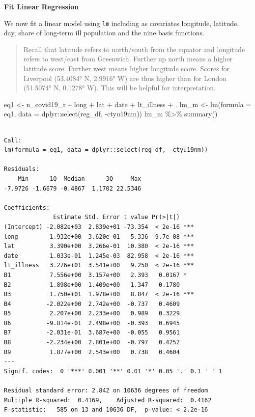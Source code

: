 \documentclass[
  letterpaper,
  DIV=11,
  numbers=noendperiod,
  oneside]{scrreprt}
\newenvironment{Shaded}{\begin{snugshade}}{\end{snugshade}}
\newcommand{\AttributeTok}[1]{\textcolor[rgb]{0.40,0.45,0.13}{#1}}
\newcommand{\FunctionTok}[1]{\textcolor[rgb]{0.28,0.35,0.67}{#1}}
\newcommand{\NormalTok}[1]{\textcolor[rgb]{0.00,0.23,0.31}{#1}}
\newcommand{\OtherTok}[1]{\textcolor[rgb]{0.00,0.23,0.31}{#1}}
\newcommand{\SpecialCharTok}[1]{\textcolor[rgb]{0.37,0.37,0.37}{#1}}
\begin{document}
\textbf{Fit Linear Regression}

We now fit a linear model using \texttt{lm} including as covariates
longitude, latitude, day, share of long-term ill population and the nine
basis functions.

\begin{quote}
Recall that latitude refers to north/south from the equator and
longitude refers to west/east from Greenwich. Further up north means a
higher latitude score. Further west means higher longitude score. Scores
for Liverpool (53.4084° N, 2.9916° W) are thus higher than for London
(51.5074° N, 0.1278° W). This will be helpful for interpretation.
\end{quote}

\begin{Shaded}
\begin{Highlighting}[]
\NormalTok{eq1 }\OtherTok{\textless{}{-}}\NormalTok{ n\_covid19\_r }\SpecialCharTok{\textasciitilde{}}\NormalTok{ long }\SpecialCharTok{+}\NormalTok{ lat }\SpecialCharTok{+}\NormalTok{ date }\SpecialCharTok{+}\NormalTok{ lt\_illness }\SpecialCharTok{+}\NormalTok{ .}
\NormalTok{lm\_m }\OtherTok{\textless{}{-}} \FunctionTok{lm}\NormalTok{(}\AttributeTok{formula =}\NormalTok{ eq1, }
           \AttributeTok{data =}\NormalTok{ dplyr}\SpecialCharTok{::}\FunctionTok{select}\NormalTok{(reg\_df, }\SpecialCharTok{{-}}\NormalTok{ctyu19nm))}
\NormalTok{lm\_m }\SpecialCharTok{\%\textgreater{}\%} \FunctionTok{summary}\NormalTok{()}
\end{Highlighting}
\end{Shaded}

\begin{verbatim}

Call:
lm(formula = eq1, data = dplyr::select(reg_df, -ctyu19nm))

Residuals:
    Min      1Q  Median      3Q     Max 
-7.9726 -1.6679 -0.4867  1.1702 22.5346 

Coefficients:
              Estimate Std. Error t value Pr(>|t|)    
(Intercept) -2.082e+03  2.839e+01 -73.354  < 2e-16 ***
long        -1.932e+00  3.620e-01  -5.336  9.7e-08 ***
lat          3.390e+00  3.266e-01  10.380  < 2e-16 ***
date         1.033e-01  1.245e-03  82.958  < 2e-16 ***
lt_illness   3.276e+01  3.541e+00   9.250  < 2e-16 ***
B1           7.556e+00  3.157e+00   2.393   0.0167 *  
B2           1.898e+00  1.409e+00   1.347   0.1780    
B3           1.750e+01  1.978e+00   8.847  < 2e-16 ***
B4          -2.022e+00  2.742e+00  -0.737   0.4609    
B5           2.207e+00  2.233e+00   0.989   0.3229    
B6          -9.814e-01  2.498e+00  -0.393   0.6945    
B7          -2.031e-01  3.687e+00  -0.055   0.9561    
B8          -2.234e+00  2.801e+00  -0.797   0.4252    
B9           1.877e+00  2.543e+00   0.738   0.4604    
---
Signif. codes:  0 '***' 0.001 '**' 0.01 '*' 0.05 '.' 0.1 ' ' 1

Residual standard error: 2.842 on 10636 degrees of freedom
Multiple R-squared:  0.4169,    Adjusted R-squared:  0.4162 
F-statistic:   585 on 13 and 10636 DF,  p-value: < 2.2e-16
\end{verbatim}
\end{document}
